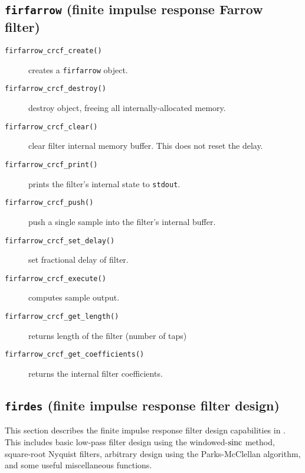 % 
%
\subsection{{\tt firfarrow} (finite impulse response Farrow filter)}
\begin{description}
\item[{\tt firfarrow\_crcf\_create()}]
    creates a {\tt firfarrow} object.
\item[{\tt firfarrow\_crcf\_destroy()}]
    destroy object, freeing all internally-allocated memory.
\item[{\tt firfarrow\_crcf\_clear()}]
    clear filter internal memory buffer.
    This does not reset the delay.
\item[{\tt firfarrow\_crcf\_print()}]
    prints the filter's internal state to {\tt stdout}.
\item[{\tt firfarrow\_crcf\_push()}]
    push a single sample into the filter's internal buffer.
\item[{\tt firfarrow\_crcf\_set\_delay()}]
    set fractional delay of filter.
\item[{\tt firfarrow\_crcf\_execute()}]
    computes sample output.
\item[{\tt firfarrow\_crcf\_get\_length()}]
    returns length of the filter (number of taps)
\item[{\tt firfarrow\_crcf\_get\_coefficients()}]
    returns the internal filter coefficients.
\end{description}


% 
%
\subsection{{\tt firdes} (finite impulse response filter design)}
\label{module:filter:firdes}
This section describes the finite impulse response filter design
capabilities in \liquid.
This includes basic low-pass filter design using the windowed-$\textup{sinc}$
method,
square-root Nyquist filters,
arbitrary design using the Parks-McClellan algorithm,
and some useful miscellaneous functions.

